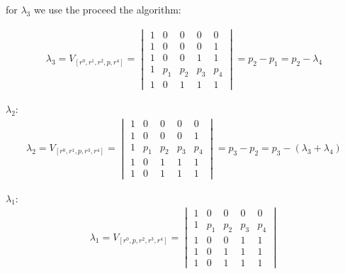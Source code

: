 \begin{}
		for $\lambda_3$ we use the proceed the algorithm:
		
		\begin{equation}
		\begin{align*}
			\lambda_3 =	V_{[r^0,r^1,r^2,p,r^4]} = 
			\begin{vmatrix}
				1 & 0 & 0 & 0 & 0\\ 
				1 & 0 & 0 & 0 & 1\\ 
				1 &  0  & 0 & 1 & 1 \\ 
				1 & p_{1} &  p_{2}& p_{3} & p_{4}\\
				1 & 0 & 1 & 1 & 1
				\end{vmatrix} = p_2 - p_1 = p_2 - \lambda_4
		\end{align*}
		\end{equation}
		
		
		$\lambda_2$:\\
		
		\begin{equation}
		\begin{align*}
			\lambda_2 =	V_{[r^0,r^1,p,r^3,r^4]} = 
			\begin{vmatrix}
				1 & 0 & 0 & 0 & 0\\ 
				1 & 0 & 0 & 0 & 1\\ 
				1 & p_{1} &  p_{2}& p_{3} & p_{4}\\
				1 &  0  & 1 & 1 & 1 \\ 
				1 & 0 & 1 & 1 & 1
				\end{vmatrix} = p_3 - p_2 = p_3 - (\lambda_3 + \lambda_4)
		\end{align*}				
		\end{equation}	
		
		
		$\lambda_1$:\\
				
		\begin{equation}
		\begin{align*}
		
		
			\lambda_1 =	V_{[r^0,p,r^2,r^3,r^4]} = 
			\begin{vmatrix}
				1 & 0 & 0 & 0 & 0\\ 
				1 & p_{1} &  p_{2}& p_{3} & p_{4}\\
				1 & 0 & 0 & 1 & 1\\ 
				1 &  0  & 1 & 1 & 1 \\ 
				1 & 0 & 1 & 1 & 1
				\end{vmatrix} \\  \\ 
				

\end{align*}
\end{equation}
\end{}
